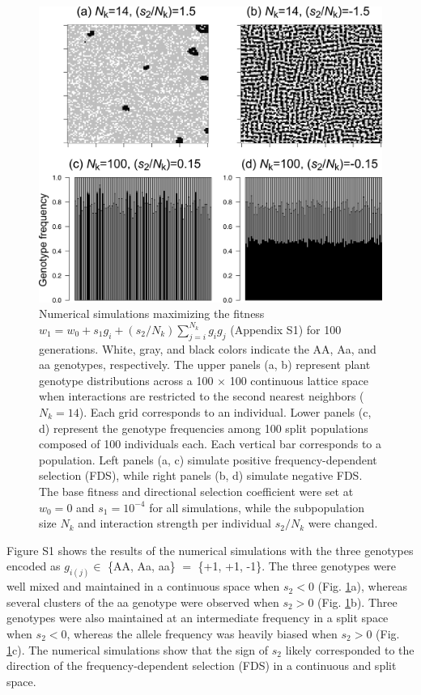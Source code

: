 \documentclass[12pt,]{article}
\begin{document}
\begin{figure}[]
  \includegraphics[width=0.8\linewidth]{IsingExample.png}
  \caption{Numerical simulations maximizing the fitness $w_1 = w_0 + s_1g_i + (s_2 / {N_k})\sum^{N_k}_{j=i}{g_ig_j}$ (Appendix S1) for 100 generations. White, gray, and black colors indicate the AA, Aa, and aa genotypes, respectively. The upper panels (a, b) represent plant genotype distributions across a 100 $\times$ 100 continuous lattice space when interactions are restricted to the second nearest neighbors ($N_k=14$). Each grid corresponds to an individual. Lower panels (c, d) represent the genotype frequencies among 100 split populations composed of 100 individuals each. Each vertical bar corresponds to a population. Left panels (a, c) simulate positive frequency-dependent selection (FDS), while right panels (b, d) simulate negative FDS. The base fitness and directional selection coefficient were set at $w_0 = 0$ and $s_1 = 10^{-4}$ for all simulations, while the subpopulation size $N_k$ and interaction strength per individual $s_2/N_k$ were changed.}
  \label{figS1:Ising}
\end{figure}

Figure S1 shows the results of the numerical simulations with the three genotypes encoded as $g_{i(j)} \in$ \{AA, Aa, aa\} $=$ \{+1, +1, -1\}. The three genotypes were well mixed and maintained in a continuous space when $s_2<0$ (Fig. \ref{figS1:Ising}a), whereas several clusters of the aa genotype were observed when $s_2>0$ (Fig. \ref{figS1:Ising}b). Three genotypes were also maintained at an intermediate frequency in a split space when $s_2<0$, whereas the allele frequency was heavily biased when $s_2>0$ (Fig. \ref{figS1:Ising}c). The numerical simulations show that the sign of $s_2$ likely corresponded to the direction of the frequency-dependent selection (FDS) in a continuous and split space.
\end{document}

